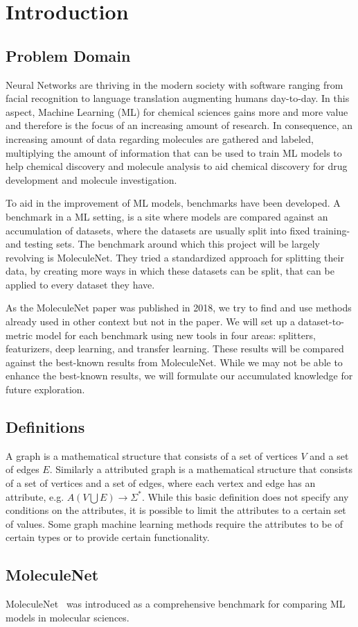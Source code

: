 \section{Introduction}

\subsection{Problem Domain}

Neural Networks are thriving in the modern society with software ranging from facial recognition to language translation augmenting humans day-to-day.
In this aspect, Machine Learning (ML) for chemical sciences gains more and more value and therefore is the focus of an increasing amount of research.
In consequence, an increasing amount of data regarding molecules are gathered and labeled, multiplying the amount of information that can be used to train ML models to help chemical discovery and molecule analysis to aid chemical discovery for drug development and molecule investigation.

To aid in the improvement of ML models, benchmarks have been developed.
A benchmark in a ML setting, is a site where models are compared against an accumulation of datasets, where the datasets are usually split into fixed training- and testing sets.
The benchmark around which this project will be largely revolving is MoleculeNet.
They tried a standardized approach for splitting their data, by creating more ways in which these datasets can be split, that can be applied to every dataset they have.

As the MoleculeNet paper was published in 2018, we try to find and use methods already used in other context but not in the paper.
We will set up a dataset-to-metric model for each benchmark using new tools in four areas: splitters, featurizers, deep learning, and transfer learning.
These results will be compared against the best-known results from MoleculeNet. While we may not be able to enhance the best-known results, we will formulate our accumulated knowledge for future exploration.

\subsection{Definitions}

A graph is a mathematical structure that consists of a set of vertices $V$ and a set of edges $E$.
Similarly a attributed graph is a mathematical structure that consists of a set of vertices and a set of edges, where each vertex and edge has an attribute, e.g. $A(V \bigcup E) \to \Sigma^*$.
While this basic definition does not specify any conditions on the attributes, it is possible to limit the attributes to a certain set of values.
Some graph machine learning methods require the attributes to be of certain types or to provide certain functionality.

\subsection{MoleculeNet}

MoleculeNet~\cite{2018moleculenet} was introduced as a comprehensive benchmark for comparing ML models in molecular sciences.